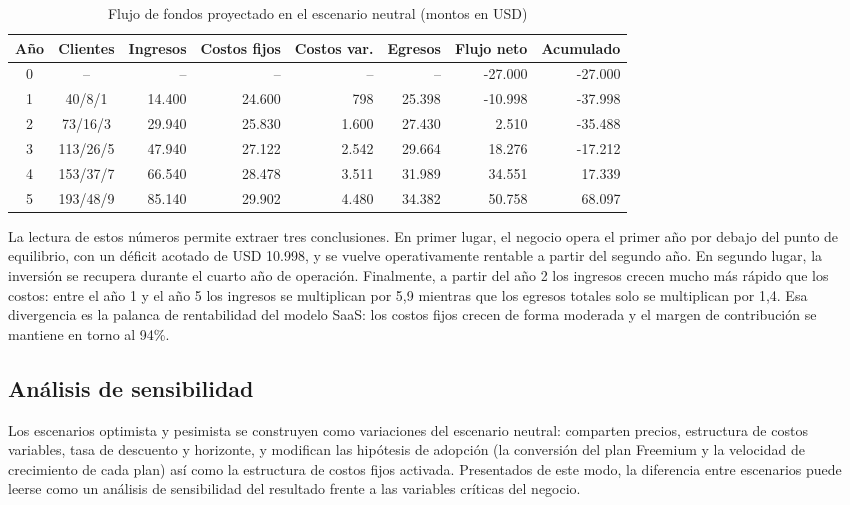 \begin{table}[H]
\centering
\footnotesize
\begin{tabular}{c c r r r r r r}
\hline
Año & Clientes & Ingresos & Costos fijos & Costos var. & Egresos & Flujo neto & Acumulado \\
\hline
0 & -- & -- & -- & -- & -- & -27.000 & -27.000 \\
1 & 40/8/1 & 14.400 & 24.600 & 798 & 25.398 & -10.998 & -37.998 \\
2 & 73/16/3 & 29.940 & 25.830 & 1.600 & 27.430 & 2.510 & -35.488 \\
3 & 113/26/5 & 47.940 & 27.122 & 2.542 & 29.664 & 18.276 & -17.212 \\
4 & 153/37/7 & 66.540 & 28.478 & 3.511 & 31.989 & 34.551 & 17.339 \\
5 & 193/48/9 & 85.140 & 29.902 & 4.480 & 34.382 & 50.758 & 68.097 \\
\hline
\end{tabular}
\caption{Flujo de fondos proyectado en el escenario neutral (montos en USD)}
\label{tab:flujo-neutral}
\end{table}

La lectura de estos números permite extraer tres conclusiones. En primer lugar, el negocio opera el primer año por debajo del punto de equilibrio, con un déficit acotado de USD 10.998, y se vuelve operativamente rentable a partir del segundo año. En segundo lugar, la inversión se recupera durante el cuarto año de operación. Finalmente, a partir del año 2 los ingresos crecen mucho más rápido que los costos: entre el año 1 y el año 5 los ingresos se multiplican por 5,9 mientras que los egresos totales solo se multiplican por 1,4. Esa divergencia es la palanca de rentabilidad del modelo SaaS: los costos fijos crecen de forma moderada y el margen de contribución se mantiene en torno al 94\%.

\subsection{Análisis de sensibilidad}

Los escenarios optimista y pesimista se construyen como variaciones del escenario neutral: comparten precios, estructura de costos variables, tasa de descuento y horizonte, y modifican las hipótesis de adopción (la conversión del plan Freemium y la velocidad de crecimiento de cada plan) así como la estructura de costos fijos activada. Presentados de este modo, la diferencia entre escenarios puede leerse como un análisis de sensibilidad del resultado frente a las variables críticas del negocio.

